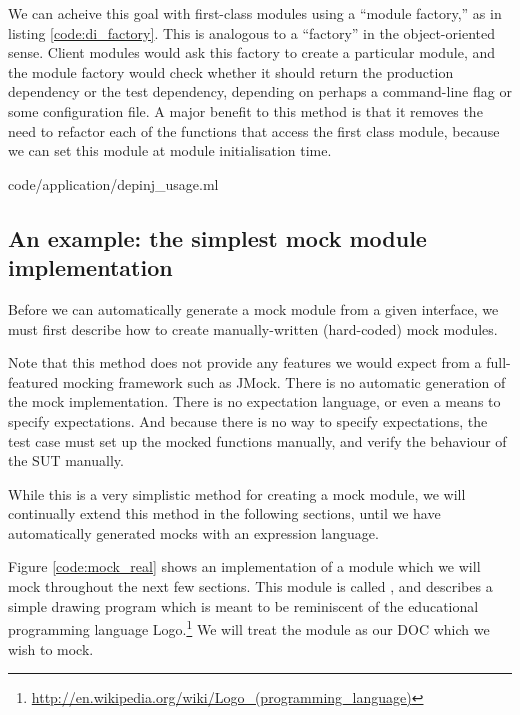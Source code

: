 We can acheive this goal with first-class modules using a ``module
factory,'' as in listing \ref{code:di_factory}. This is analogous to a
``factory'' in the object-oriented sense. Client modules would ask
this factory to create a particular module, and the module factory
would check whether it should return the production dependency or the
test dependency, depending on perhaps a command-line flag or some
configuration file. A major benefit to this method is that it removes
the need to refactor each of the functions that access the first class
module, because we can set this module at module initialisation time.

 {code/application/depinj_usage.ml}


\subsection{An example: the simplest mock module implementation}
\label{application:simple}

Before we can automatically generate a mock module from a given
interface, we must first describe how to create manually-written
(hard-coded) mock modules.

Note that this method does not provide any features we would expect
from a full-featured mocking framework such as JMock. There is no
automatic generation of the mock implementation. There is no
expectation language, or even a means to specify expectations. And
because there is no way to specify expectations, the test case must
set up the mocked functions manually, and verify the behaviour of the
SUT manually.

While this is a very simplistic method for creating a mock module, we
will continually extend this method in the following sections, until
we have automatically generated mocks with an expression
language.

Figure \ref{code:mock_real} shows an implementation of a module which
we will mock throughout the next few sections. This module is called
, and describes a simple drawing program which is meant
to be reminiscent of the educational programming language
Logo.\footnote{\url{http://en.wikipedia.org/wiki/Logo_(programming_language)}}
We will treat the  module as our DOC which we wish to
mock.

